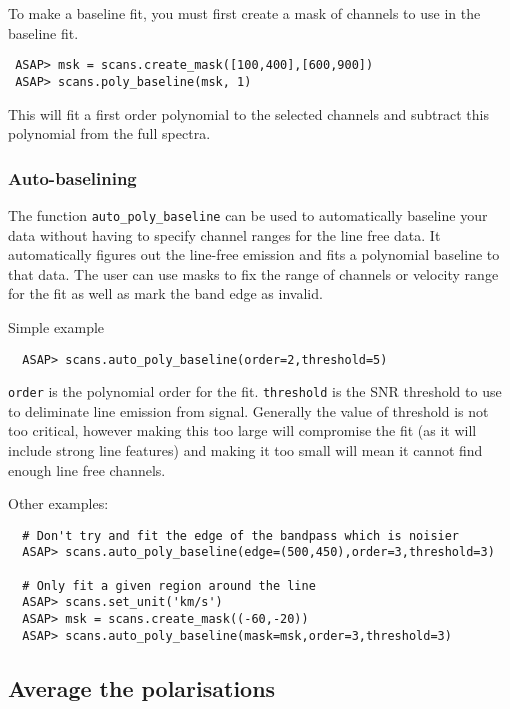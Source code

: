 \documentclass[11pt]{article}
\newcommand{\cmd}[1]{{\tt #1}}
\begin{document}
To make a baseline fit, you must first create
a mask of channels to use in the baseline fit.

\begin{verbatim}
 ASAP> msk = scans.create_mask([100,400],[600,900])
 ASAP> scans.poly_baseline(msk, 1)
\end{verbatim}

This will fit a first order polynomial to the selected channels and subtract
this polynomial from the full spectra.

\subsubsection{Auto-baselining}

The function \cmd{auto\_poly\_baseline} can be used to automatically
baseline your data without having to specify channel ranges for the
line free data. It automatically figures out the line-free emission
and fits a polynomial baseline to that data. The user can use masks to
fix the range of channels or velocity range for the fit as well as
mark the band edge as invalid.

Simple example

\begin{verbatim}
  ASAP> scans.auto_poly_baseline(order=2,threshold=5)
\end{verbatim}

\cmd{order} is the polynomial order for the fit. \cmd{threshold} is
the SNR threshold to use to deliminate line emission from
signal. Generally the value of threshold is not too critical, however
making this too large will compromise the fit (as it will include
strong line features) and making it too small will mean it cannot find
enough line free channels.


Other examples:

\begin{verbatim}
  # Don't try and fit the edge of the bandpass which is noisier
  ASAP> scans.auto_poly_baseline(edge=(500,450),order=3,threshold=3)

  # Only fit a given region around the line
  ASAP> scans.set_unit('km/s')
  ASAP> msk = scans.create_mask((-60,-20))
  ASAP> scans.auto_poly_baseline(mask=msk,order=3,threshold=3)

\end{verbatim}

\subsection{Average the polarisations}
\end{document}

